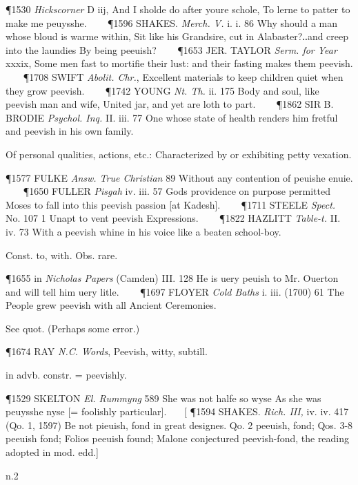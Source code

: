 \begin{description}[wide, labelwidth=!, labelindent=0pt]
\begin{myenumerate}
\P 1530 \textit{Hickscorner}  D iij, And I sholde do after youre schole, To lerne to patter to make me peuysshe.    
\P 1596 SHAKES.  \textit{Merch. V.} i. i. 86 Why should a man whose bloud is warme within, Sit like his Grandsire, cut in Alabaster?‥and creep into the laundies By being peeuish?    
\P 1653 JER. TAYLOR  \textit{Serm. for Year} xxxix, Some men fast to mortifie their lust: and their fasting makes them peevish.    
\P 1708 SWIFT  \textit{Abolit. Chr.}, Excellent materials to keep children quiet when they grow peevish.    
\P 1742 YOUNG  \textit{Nt. Th.} ii. 175 Body and soul, like peevish man and wife, United jar, and yet are loth to part.    
\P 1862 SIR B. BRODIE  \textit{Psychol. Inq.} II. iii. 77 One whose state of health renders him fretful and peevish in his own family.

 Of personal qualities, actions, etc.: Characterized by or exhibiting petty vexation.

\P 1577 FULKE  \textit{Answ. True Christian} 89 Without any contention of peuishe enuie.    
\P 1650 FULLER  \textit{Pisgah} iv. iii. 57 Gods providence on purpose permitted Moses to fall into this peevish passion [at Kadesh].    
\P 1711 STEELE  \textit{Spect.} No. 107 1 Unapt to vent peevish Expressions.    
\P 1822 HAZLITT  \textit{Table-t.} II. iv. 73 With a peevish whine in his voice like a beaten school-boy.

 Const. to, with. Obs. rare.

\P 1655 in  \textit{Nicholas Papers} (Camden) III. 128 He is uery peuish to Mr. Ouerton and will tell him uery litle.    
\P 1697 FLOYER  \textit{Cold Baths} i. iii. (1700) 61 The People grew peevish with all Ancient Ceremonies.

 See quot. (Perhaps some error.)

\P 1674 RAY  \textit{N.C. Words}, Peevish, witty, subtill.

 in advb. constr. = peevishly.

\P 1529 SKELTON  \textit{El. Rummyng} 589 She was not halfe so wyse As she was peuysshe nyse [= foolishly particular].    [
\P 1594 SHAKES.  \textit{Rich. III,} iv. iv. 417 (Qo. 1, 1597) Be not pieuish, fond in great designes. Qo. 2 peeuish, fond; Qos. 3-8 peeuish fond; Folios peeuish found; Malone conjectured peevish-fond, the reading adopted in mod. edd.]
\end{myenumerate}


 n.2


\end{description}
